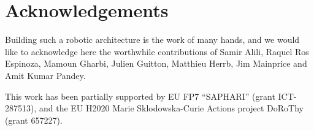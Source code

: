 \documentclass[preprint,3p,times]{elsarticle}
\begin{document}
\section*{Acknowledgements}

Building such a robotic architecture is the work of many hands, and we would
like to acknowledge here the worthwhile contributions of Samir Alili, Raquel Ros
Espinoza, Mamoun Gharbi, Julien Guitton, Matthieu Herrb, Jim Mainprice and Amit
Kumar Pandey.

This work has been partially supported by EU FP7 ``SAPHARI'' (grant ICT-287513),
and the EU H2020 Marie Sklodowska-Curie Actions project DoRoThy (grant 657227).




%

\end{document}
